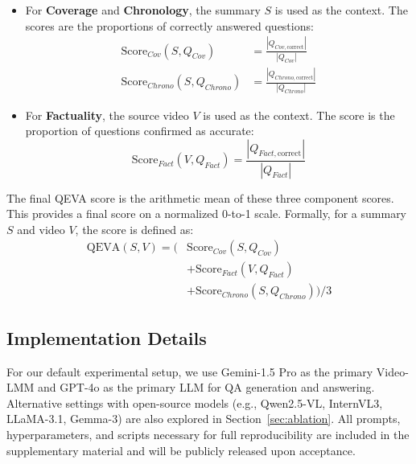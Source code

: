 \begin{itemize}
    \item For \textbf{Coverage} and \textbf{Chronology}, the summary \(S\) is used as the context. The scores are the proportions of correctly answered questions:
    \begin{align}
        \mathrm{Score}_{Cov}(S, Q_{Cov}) &= \frac{\left|Q_{Cov, \text{correct}}\right|}{\left|Q_{Cov}\right|} \\
        \mathrm{Score}_{Chrono}(S, Q_{Chrono}) &= \frac{\left|Q_{Chrono, \text{correct}}\right|}{\left|Q_{Chrono}\right|}
    \end{align}
    \item For \textbf{Factuality}, the source video \(V\) is used as the context. The score is the proportion of questions confirmed as accurate:
    \begin{equation}
        \mathrm{Score}_{Fact}(V, Q_{Fact}) = \frac{\left|Q_{Fact, \text{correct}}\right|}{\left|Q_{Fact}\right|}
    \end{equation}
\end{itemize}

The final QEVA score is the arithmetic mean of these three component scores. This provides a final score on a normalized 0-to-1 scale. Formally, for a summary \(S\) and video \(V\), the score is defined as:
\begin{equation}
\begin{split}
\mathrm{QEVA}(S, V) = \bigl( & \mathrm{Score}_{Cov}(S, Q_{Cov}) \\
& + \mathrm{Score}_{Fact}(V, Q_{Fact}) \\
& + \mathrm{Score}_{Chrono}(S, Q_{Chrono}) \bigr) / 3
\end{split}
\end{equation}

\subsection{Implementation Details}
For our default experimental setup, we use Gemini-1.5 Pro as the primary Video-LMM and GPT-4o as the primary LLM for QA generation and answering. Alternative settings with open-source models (e.g., Qwen2.5-VL, InternVL3, LLaMA-3.1, Gemma-3) are also explored in Section~\ref{sec:ablation}. All prompts, hyperparameters, and scripts necessary for full reproducibility are included in the supplementary material and will be publicly released upon acceptance.